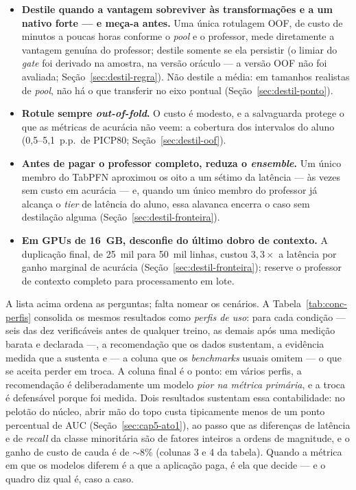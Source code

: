 \begin{itemize}
    qualquer professor precise ser carregado --- no conjunto
    \texttt{wine\_quality}, venceu até o professor (E1,
    Seção~\ref{sec:destil-e1}); um MLP-quantil cobre os conjuntos
    pequenos e numéricos (Seção~\ref{sec:destil-regra}).
  \item \textbf{Destile quando a vantagem sobreviver às
    transformações e a um nativo forte --- e meça-a antes.} Uma única
    rotulagem OOF, de custo de minutos a poucas horas conforme o
    \emph{pool} e o professor, mede diretamente a vantagem
    genuína do professor; destile somente se ela persistir (o limiar
    do \emph{gate} foi derivado na amostra, na versão oráculo --- a
    versão OOF não foi avaliada;
    Seção~\ref{sec:destil-regra}). Não destile a média: em
    tamanhos realistas de \emph{pool}, não há o que transferir no
    eixo pontual
    (Seção~\ref{sec:destil-ponto}).
  \item \textbf{Rotule sempre \emph{out-of-fold}.} O custo é modesto, e
    a salvaguarda protege o que as métricas de acurácia não veem: a
    cobertura dos intervalos do aluno (0,5--5,1~p.p.\ de PICP80;
    Seção~\ref{sec:destil-oof}).
  \item \textbf{Antes de pagar o professor completo, reduza o
    \emph{ensemble}.} Um único membro do TabPFN aproximou os oito a um
    sétimo da latência --- às vezes sem custo em acurácia --- e,
    quando um único membro do professor já alcança o \emph{tier} de
    latência do aluno, essa alavanca encerra o caso sem destilação
    alguma (Seção~\ref{sec:destil-fronteira}).
  \item \textbf{Em GPUs de 16~GB, desconfie do último dobro de
    contexto.} A duplicação final, de 25~mil para 50~mil linhas, custou
    $3{,}3\times$ a latência por ganho marginal de acurácia
    (Seção~\ref{sec:destil-fronteira}); reserve o professor de contexto
    completo para processamento em lote.
\end{itemize}

A lista acima ordena as perguntas; falta nomear os cenários. A
Tabela~\ref{tab:conc-perfis} consolida os mesmos resultados como
\emph{perfis de uso}: para cada condição --- seis das dez
verificáveis antes de qualquer
treino, as demais após uma medição barata e declarada ---, a
recomendação que os dados sustentam, a evidência medida que a
sustenta e --- a coluna que os \emph{benchmarks} usuais omitem --- o que
se aceita perder em troca. A coluna final é o ponto: em vários perfis, a
recomendação é deliberadamente um modelo \emph{pior na métrica
primária}, e a troca é defensável porque foi medida. Dois resultados
sustentam essa contabilidade: no pelotão do núcleo, abrir mão do topo
custa tipicamente menos de um ponto percentual de AUC
(Seção~\ref{sec:cap5-ato1}), ao passo que as diferenças de latência
e de \emph{recall} da classe minoritária são de
fatores inteiros a ordens de magnitude, e o ganho de custo de cauda
é de ${\sim}8\%$ (colunas 3 e 4 da tabela).
Quando a métrica em que os modelos diferem é a que a
aplicação paga, é ela que decide --- e o quadro diz qual é, caso a
caso.


